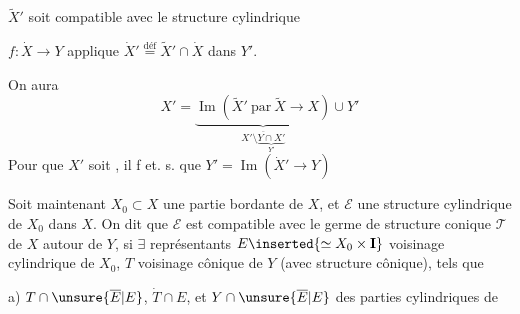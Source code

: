  $\widetilde X'$ soit compatible avec le  structure cylindrique

 $f:\dot X\to Y$ applique 
$\dot X'\overset{\text{déf}}{=}\widetilde X'\cap\dot X$ dans $Y'$.

On aura
\[
X'=\underbrace{\operatorname{Im}(\widetilde X'\ \text{par}\ \widetilde X\to X)}
_{\overline{X'\setminus\underbrace{Y\cap X'}_{Y'}}}\cup Y'
\]
Pour que $X'$ soit 
,
il f et. s. que $Y'=\operatorname{Im}(\dot X'\to Y)$

Soit maintenant $X_0\subset X$ une partie
bordante de $X$, et $\mathcal E$ une  structure cylindrique
de $X_0$ dans $X$. On dit que $\mathcal E$ est compatible
avec le germe de structure conique $\mathcal T$
de $X$ autour de $Y$, si $\exists$ représentants
$E\inserted{\simeq X_0\times\mathbf I}$ voisinage cylindrique de $X_0$,  $T$ voisinage
cônique de $Y$ (avec  structure cônique), tels que


a) $T\cap\unsure{\overline E|E}$, $\dot T\cap E$, et $Y\cap\unsure{\overline E|E}$
  des parties cylindriques de


